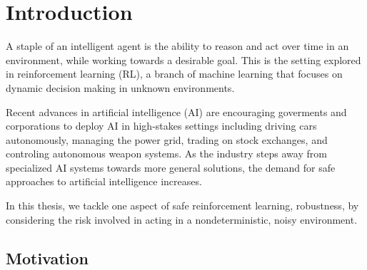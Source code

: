 \chapter{Introduction}\label{ch:intro}
%

A staple of an intelligent agent is the ability to reason and act over time in an environment, while working towards a desirable goal. This is the setting explored in reinforcement learning (RL), a branch of machine learning that focuses on dynamic decision making in unknown environments.

Recent advances in artificial intelligence (AI) are encouraging goverments and corporations to deploy AI in high-stakes settings including driving cars autonomously, managing the power grid, trading on stock exchanges, and controling autonomous weapon systems. As the industry steps away from specialized AI systems towards more general solutions, the demand for safe approaches to artificial intelligence increases.

In this thesis, we tackle one aspect of safe reinforcement learning, robustness, by considering the risk involved in acting in a nondeterministic, noisy environment.

\section{Motivation}\label{sec:intro:motivation}

